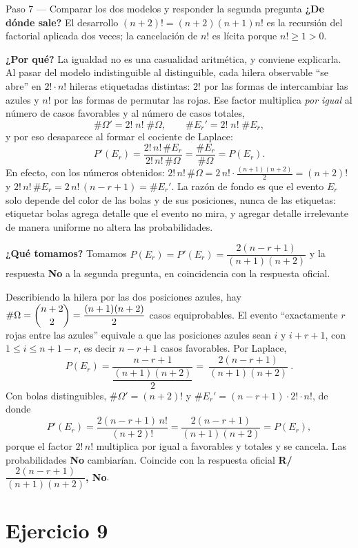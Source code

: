 \documentclass[11pt]{article}
\begin{document}
\begin{sol}
\begin{paso}{Paso 7 --- Comparar los dos modelos y responder la segunda pregunta}
\textbf{¿De dónde sale?} El desarrollo $(n+2)!=(n+2)(n+1)n!$ es la recursión del factorial
aplicada dos veces; la cancelación de $n!$ es lícita porque $n!\ge 1>0$.

\textbf{¿Por qué?} La igualdad no es una casualidad aritmética, y conviene explicarla. Al
pasar del modelo indistinguible al distinguible, cada hilera observable ``se abre'' en
$2!\cdot n!$ hileras etiquetadas distintas: $2!$ por las formas de intercambiar las azules y
$n!$ por las formas de permutar las rojas. Ese factor multiplica \emph{por igual} al número de
casos favorables y al número de casos totales,
\[
\#\Omega'=2!\;n!\;\#\Omega,\qquad \#E_r'=2!\;n!\;\#E_r,
\]
y por eso desaparece al formar el cociente de Laplace:
\[
P'(E_r)=\frac{2!\,n!\,\#E_r}{2!\,n!\,\#\Omega}=\frac{\#E_r}{\#\Omega}=P(E_r).
\]
En efecto, con los números obtenidos: $2!\,n!\,\#\Omega=2\,n!\cdot\frac{(n+1)(n+2)}{2}=(n+2)!$
y $2!\,n!\,\#E_r=2\,n!\,(n-r+1)=\#E_r'$. La razón de fondo es que el evento $E_r$ solo depende
del color de las bolas y de sus posiciones, nunca de las etiquetas: etiquetar bolas agrega
detalle que el evento no mira, y agregar detalle irrelevante de manera uniforme no altera las
probabilidades.

\textbf{¿Qué tomamos?} Tomamos $P(E_r)=P'(E_r)=\dfrac{2(n-r+1)}{(n+1)(n+2)}$ y la respuesta
\textbf{No} a la segunda pregunta, en coincidencia con la respuesta oficial.
\end{paso}
\end{sol}

\begin{resp}
Describiendo la hilera por las dos posiciones azules, hay
$\#\Omega=\dbinom{n+2}{2}=\dfrac{(n+1)(n+2)}{2}$ casos equiprobables. El evento ``exactamente
$r$ rojas entre las azules'' equivale a que las posiciones azules sean $i$ y $i+r+1$, con
$1\le i\le n+1-r$, es decir $n-r+1$ casos favorables. Por Laplace,
\[
P(E_r)=\frac{n-r+1}{\dfrac{(n+1)(n+2)}{2}}=\boxed{\ \frac{2(n-r+1)}{(n+1)(n+2)}\ }.
\]
Con bolas distinguibles, $\#\Omega'=(n+2)!$ y $\#E_r'=(n-r+1)\cdot 2!\cdot n!$, de donde
\[
P'(E_r)=\frac{2(n-r+1)\,n!}{(n+2)!}=\frac{2(n-r+1)}{(n+1)(n+2)}=P(E_r),
\]
porque el factor $2!\,n!$ multiplica por igual a favorables y totales y se cancela. Las
probabilidades \textbf{No} cambiarían. Coincide con la respuesta oficial
\textbf{R/ $\dfrac{2(n-r+1)}{(n+1)(n+2)}$, No}.
\end{resp}

\section*{Ejercicio 9}
\end{document}
